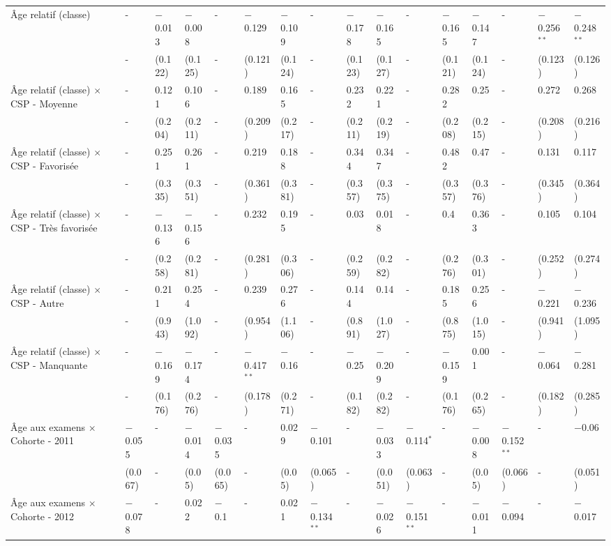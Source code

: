 \documentclass[
]{book}
\begin{document}
\begin{ThreePartTable}
\begin{longtable}[t]{llllllllllllllll}
Âge relatif (classe) & - & $-$0.013 & $-$0.008 & - & $-$0.129 & $-$0.109 & - & $-$0.178 & $-$0.165 & - & $-$0.165 & $-$0.147 & - & $-$0.256$^{**}$ & $-$0.248$^{**}$\\
 & - & (0.122) & (0.125) & - & (0.121) & (0.124) & - & (0.123) & (0.127) & - & (0.121) & (0.124) & - & (0.123) & (0.126)\\
Âge relatif (classe) $\times$ CSP - Moyenne & - & 0.121 & 0.106 & - & 0.189 & 0.165 & - & 0.232 & 0.221 & - & 0.282 & 0.25 & - & 0.272 & 0.268\\
 & - & (0.204) & (0.211) & - & (0.209) & (0.217) & - & (0.211) & (0.219) & - & (0.208) & (0.215) & - & (0.208) & (0.216)\\
Âge relatif (classe) $\times$ CSP - Favorisée & - & 0.251 & 0.261 & - & 0.219 & 0.188 & - & 0.344 & 0.347 & - & 0.482 & 0.47 & - & 0.131 & 0.117\\
 & - & (0.335) & (0.351) & - & (0.361) & (0.381) & - & (0.357) & (0.375) & - & (0.357) & (0.376) & - & (0.345) & (0.364)\\
Âge relatif (classe) $\times$ CSP - Très favorisée & - & $-$0.136 & $-$0.156 & - & 0.232 & 0.195 & - & 0.03 & 0.018 & - & 0.4 & 0.363 & - & 0.105 & 0.104\\
 & - & (0.258) & (0.281) & - & (0.281) & (0.306) & - & (0.259) & (0.282) & - & (0.276) & (0.301) & - & (0.252) & (0.274)\\
Âge relatif (classe) $\times$ CSP - Autre & - & 0.211 & 0.254 & - & 0.239 & 0.276 & - & 0.144 & 0.14 & - & 0.185 & 0.256 & - & $-$0.221 & $-$0.236\\
 & - & (0.943) & (1.092) & - & (0.954) & (1.106) & - & (0.891) & (1.027) & - & (0.875) & (1.015) & - & (0.941) & (1.095)\\
Âge relatif (classe) $\times$ CSP - Manquante & - & $-$0.169 & $-$0.174 & - & $-$0.417$^{**}$ & $-$0.16 & - & $-$0.25 & $-$0.209 & - & $-$0.159 & 0.001 & - & $-$0.064 & $-$0.281\\
 & - & (0.176) & (0.276) & - & (0.178) & (0.271) & - & (0.182) & (0.282) & - & (0.176) & (0.265) & - & (0.182) & (0.285)\\
Âge aux examens $\times$ Cohorte - 2011 & $-$0.055 & - & $-$0.014 & $-$0.035 & - & 0.029 & $-$0.101 & - & $-$0.033 & $-$0.114$^{*}$ & - & $-$0.008 & $-$0.152$^{**}$ & - & $-$0.06\\
 & (0.067) & - & (0.05) & (0.065) & - & (0.05) & (0.065) & - & (0.051) & (0.063) & - & (0.05) & (0.066) & - & (0.051)\\
Âge aux examens $\times$ Cohorte - 2012 & $-$0.078 & - & 0.022 & $-$0.1 & - & 0.021 & $-$0.134$^{**}$ & - & $-$0.026 & $-$0.151$^{**}$ & - & $-$0.011 & $-$0.094 & - & $-$0.017\\

\end{longtable}
\end{ThreePartTable}
\end{document}
